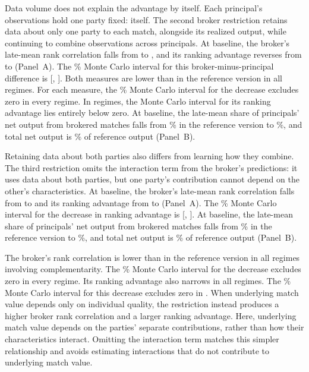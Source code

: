 Data volume does not explain the advantage by itself. Each principal's observations hold one party fixed: itself. The second broker restriction retains data about only one party to each match, alongside its realized output, while continuing to combine observations across principals. At baseline, the broker's late-mean rank correlation falls from  to , and its ranking advantage reverses from  to  (Panel~A). The \% Monte Carlo interval for this broker-minus-principal difference is [, ]. Both measures are lower than in the reference version in all  regimes. For each measure, the \% Monte Carlo interval for the decrease excludes zero in every regime. In  regimes, the Monte Carlo interval for its ranking advantage lies entirely below zero. At baseline, the late-mean share of principals' net output from brokered matches falls from \% in the reference version to \%, and total net output is \% of reference output (Panel~B).

Retaining data about both parties also differs from learning how they combine. The third restriction omits the interaction term from the broker's predictions: it uses data about both parties, but one party's contribution cannot depend on the other's characteristics. At baseline, the broker's late-mean rank correlation falls from  to  and its ranking advantage from  to  (Panel~A). The \% Monte Carlo interval for the  decrease in ranking advantage is [, ]. At baseline, the late-mean share of principals' net output from brokered matches falls from \% in the reference version to \%, and total net output is \% of reference output (Panel~B).

The broker's rank correlation is lower than in the reference version in all  regimes involving complementarity. The \% Monte Carlo interval for the decrease excludes zero in every regime. Its ranking advantage also narrows in all  regimes. The \% Monte Carlo interval for this decrease excludes zero in . When underlying match value depends only on individual quality, the restriction instead produces a higher broker rank correlation and a larger ranking advantage. Here, underlying match value depends on the parties' separate contributions, rather than how their characteristics interact. Omitting the interaction term matches this simpler relationship and avoids estimating interactions that do not contribute to underlying match value.


